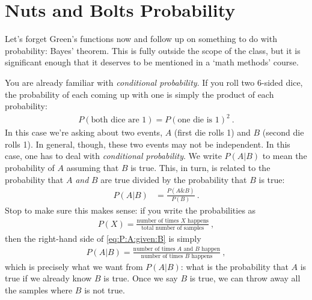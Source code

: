 \section{Nuts and Bolts Probability}
\label{sec:probability}

Let's forget Green's functions now and follow up on something to do with probability: Bayes' theorem. This is fully outside the scope of the class, but it is significant enough that it deserves to be mentioned in a `math methods' course. 

You are already familiar with \emph{conditional probability}. If you roll two 6-sided dice, the probability of each coming up with one is simply the product of each probability:
\begin{align}
	P(\text{both dice are 1}) = P(\text{one die is 1})^2 \ .
\end{align}
In this case we're asking about two events, $A$ (first die rolls 1) and $B$ (second die rolls 1). In general, though, these two events may not be independent. In this case, one has to deal with \emph{conditional probability}. We write $P(A|B)$ to mean the probability of $A$ assuming that $B$ is true. This, in turn, is related to the probability that $A$ \emph{and} $B$ are true divided by the probability that $B$ is true:
\begin{align}
	P(A|B) &= \frac{P(A\& B)}{P(B)} \ .
	\label{eq:P:A:given:B}
\end{align}
Stop to make sure this makes sense: if you write the probabilities as
\begin{align}
	P(X) = \frac{\text{number of times $X$ happens}}{\text{total number of samples}} \ ,
\end{align}
then the right-hand side of \eqref{eq:P:A:given:B} is simply
\begin{align}
	P(A|B) = \frac{\text{number of times $A$ and $B$ happen}}{\text{number of times $B$ happens}} \ , 
\end{align}
which is precisely what we want from $P(A|B)$: what is the probability that $A$ is true if we already know $B$ is true. Once we say $B$ is true, we can throw away all the samples where $B$ is not true.

